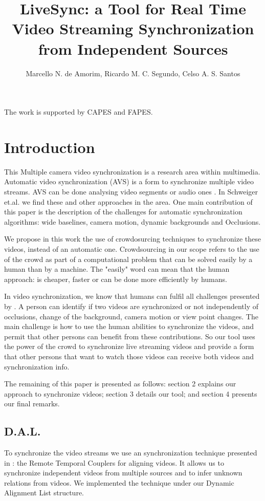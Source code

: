 \documentclass[jidm,a4paper]{jidm} %
\title{LiveSync: a Tool for Real Time Video Streaming Synchronization from Independent Sources}
\author{Marcello N. de Amorim\inst{1}, Ricardo M. C. Segundo\inst{2}, Celso A. S. Santos\inst{3}}
\institute{Universidade Federal do Espirito Santo, Brazil  \\ \email{novaes@inf.ufes.br , rmcs87@gmail.com , saibel@inf.ufes.br}
}
\begin{document}
\begin{bottomstuff}
The work is supported by CAPES and FAPES.
\end{bottomstuff}

\maketitle

\section{Introduction}
This 
Multiple camera video synchronization is a research area within multimedia. Automatic video synchronization (AVS) is a form to synchronize multiple video streams. AVS can be done analysing video segments \cite{wang2014videosnapping} or audio ones \cite{su2012making}. In Schweiger et.al.\cite{schweiger2013fully} we find these and other approaches in the area. One main contribution of this paper is the description of the challenges for automatic synchronization algorithms: wide baselines, camera motion, dynamic backgrounds and Occlusions.

We propose in this work the use of crowdosurcing techniques to synchronize these videos, instead of an automatic one. Crowdsourcing \cite{howe2006rise} in our scope refers to the use of the crowd as part of a computational problem that can be solved easily by a human than by a machine. The "easily" word can mean that the human approach: is cheaper, faster or can be done more efficiently by humans.

In video synchronization, we know that humans can fulfil all challenges presented by \cite{schweiger2013fully}. A person can identify if two videos are synchronized or not independently of occlusions, change of the background, camera motion or view point changes. The main challenge is how to use the human abilities to synchronize the videos, and permit that other persons can benefit from these contributions. So our tool uses the power of the crowd to synchronize live streaming videos and provide a form that other persons that want to watch those videos can receive both videos and synchronization info.

The remaining of this paper is presented as follows: section 2 explains our approach to synchronize videos; section 3 details our tool; and section 4 presents our final remarks.

\subsection{D.A.L.}
To synchronize the video streams we use an synchronization technique presented in \cite{segundo2015remote}: the Remote Temporal Couplers for aligning videos. It allows us to synchronize independent videos from multiple sources and to infer unknown relations from videos. We implemented the technique under our Dynamic Alignment List structure.
\end{document}
